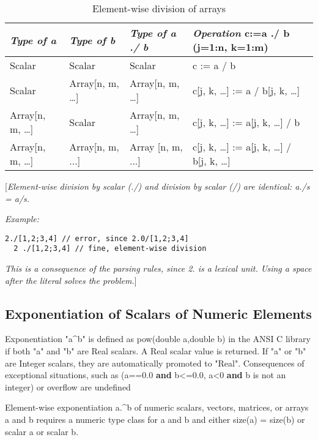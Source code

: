\begin{longtable}[]{|l|l|l|l|}
\caption{Element-wise division of arrays}\\
\hline \endhead
\emph{Type of a} & \emph{Type of b} & \emph{Type of a ./ b} &
\emph{Operation} c:=a ./ b (j=1:n, k=1:m)\\ \hline
Scalar & Scalar & Scalar & c := a / b\\ \hline
Scalar & Array{[}n, m, \ldots{}{]} & Array{[}n, m, \ldots{}{]} & c{[}j,
k, \ldots{}{]} := a / b{[}j, k, \ldots{}{]}\\ \hline
Array{[}n, m, \ldots{}{]} & Scalar & Array{[}n, m, \ldots{}{]} & c{[}j,
k, \ldots{}{]} := a{[}j, k, \ldots{}{]} / b\\ \hline
Array{[}n, m, \ldots{}{]} & Array{[}n, m, ...{]} & Array {[}n, m, ...{]}
& c{[}j, k, \ldots{}{]} := a{[}j, k, \ldots{}{]} / b{[}j, k,
\ldots{}{]}\\ \hline

\end{longtable}

{[}\emph{Element-wise division by scalar (./) and division by scalar (/)
are identical: a./s = a/s.}

\emph{Example:}

\begin{lstlisting}[language=modelica]
  2./[1,2;3,4] // error, since 2.0/[1,2;3,4]
  2 ./[1,2;3,4] // fine, element-wise division
\end{lstlisting}
\emph{This is a consequence of the parsing rules, since 2. is a lexical
unit. Using a space after the literal solves the problem.}{]}

\subsection{Exponentiation of Scalars of Numeric Elements}

Exponentiation "a\^{}b" is defined as pow(double a,double b) in the ANSI
C library if both "a" and "b" are Real scalars. A Real scalar value is
returned. If "a" or "b" are Integer scalars, they are automatically
promoted to "Real". Consequences of exceptional situations, such as
(a==0.0 \textbf{and} b\textless{}=0.0, a\textless{}0 \textbf{and} b is
not an integer) or overflow are undefined

Element-wise exponentiation a.\^{}b of numeric scalars, vectors,
matrices, or arrays a and b requires a numeric type class for a and b
and either size(a) = size(b) or scalar a or scalar b.

